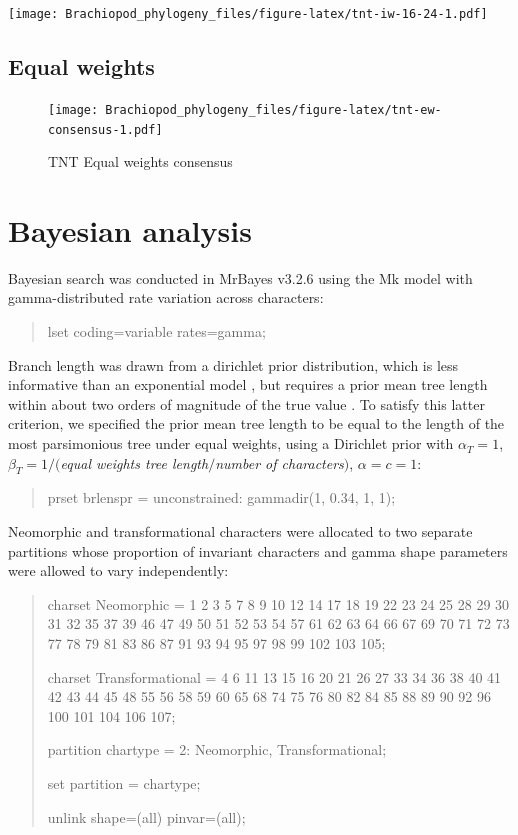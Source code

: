 \documentclass[openany]{book}
\theoremstyle{definition}
\theoremstyle{definition}
\theoremstyle{definition}
\theoremstyle{remark}
\begin{document}
\texttt{[image: Brachiopod\_phylogeny\_files/figure-latex/tnt-iw-16-24-1.pdf]}

\hypertarget{equal-weights}{%
\section{Equal weights}\label{equal-weights}}

\begin{figure}
\centering
\texttt{[image: Brachiopod\_phylogeny\_files/figure-latex/tnt-ew-consensus-1.pdf]}
\caption{\label{fig:tnt-ew-consensus}TNT Equal weights consensus}
\end{figure}

\hypertarget{bayesian}{%
\chapter{Bayesian analysis}\label{bayesian}}

Bayesian search was conducted in MrBayes v3.2.6 \citep{Ronquist2012}
using the Mk model \citep{Lewis2001} with gamma-distributed rate
variation across characters:

\begin{quote}
lset coding=variable rates=gamma;
\end{quote}

Branch length was drawn from a dirichlet prior distribution, which is
less informative than an exponential model \citep{Rannala2012}, but
requires a prior mean tree length within about two orders of magnitude
of the true value \citep{Zhang2012}. To satisfy this latter criterion,
we specified the prior mean tree length to be equal to the length of the
most parsimonious tree under equal weights, using a Dirichlet prior with
\(\alpha_T = 1\), \(\beta_T = 1/(\)\emph{equal weights tree
length}\(/\)\emph{number of characters}\()\), \(\alpha = c = 1\):

\begin{quote}
prset brlenspr = unconstrained: gammadir(1, 0.34, 1, 1);
\end{quote}

Neomorphic and transformational characters
\citep[\emph{sensu}][]{Sereno2007} were allocated to two separate
partitions whose proportion of invariant characters and gamma shape
parameters were allowed to vary independently:

\begin{quote}
charset Neomorphic = 1 2 3 5 7 8 9 10 12 14 17 18 19 22 23 24 25 28 29
30 31 32 35 37 39 46 47 49 50 51 52 53 54 57 61 62 63 64 66 67 69 70 71
72 73 77 78 79 81 83 86 87 91 93 94 95 97 98 99 102 103 105;

charset Transformational = 4 6 11 13 15 16 20 21 26 27 33 34 36 38 40 41
42 43 44 45 48 55 56 58 59 60 65 68 74 75 76 80 82 84 85 88 89 90 92 96
100 101 104 106 107;

partition chartype = 2: Neomorphic, Transformational;

set partition = chartype;

unlink shape=(all) pinvar=(all);
\end{quote}
\end{document}

